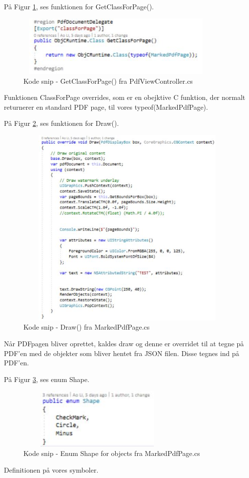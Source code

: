 På Figur \ref{fig:ClassPage}, ses funktionen for GetClassForPage().
\begin{figure}[H] %
	\centering
	\includegraphics[height=3cm, width=10cm]{../ArkitekturDesign/Design/RegisterPDF/ClassPage}
	\caption{Kode snip - GetClassForPage() fra PdfViewController.cs}
	\label{fig:ClassPage}
\end{figure}
Funktionen ClassForPage overrides, som er en obejktive C funktion, der normalt returnerer en standard PDF page, til vores typeof(MarkedPdfPage).

På Figur \ref{fig:Draw}, ses funktionen for Draw().
\begin{figure}[H] %
	\centering
	\includegraphics[height=10cm, width=15cm]{../ArkitekturDesign/Design/RegisterPDF/Draw}
	\caption{Kode snip - Draw() fra MarkedPdfPage.cs}
	\label{fig:Draw}
\end{figure}
Når PDFpagen bliver oprettet, kaldes draw og denne er overridet til at tegne på PDF'en med de objekter som bliver hentet fra JSON filen. Disse tegnes ind på PDF'en.

\clearpage

På Figur \ref{fig:Enum}, ses enum Shape.
\begin{figure}[H] %
	\centering
	\includegraphics[height=3cm, width=8cm]{../ArkitekturDesign/Design/RegisterPDF/Enum}
	\caption{Kode snip - Enum Shape for objects fra MarkedPdfPage.cs}
	\label{fig:Enum}
\end{figure}
Definitionen på vores symboler.
